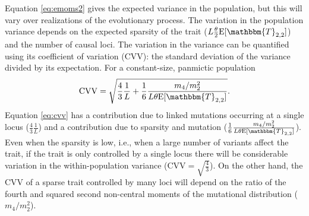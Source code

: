 Equation \eqref{eq:emoms2} gives the expected variance in the population, but
this will vary over realizations of the evolutionary process. The variation in
the population variance depends on the expected sparsity of the trait ($L\T
\E[\mathbbm{T}_{2,2}]$) and the number of causal loci. The variation in the
variance can be quantified using its coefficient of variation (CVV): the
standard deviation of the variance divided by its expectation. For a
constant-size, panmictic population
\begin{equation}
  \label{eq:cvv}
  \mathrm{CVV} = \sqrt{\frac{4}{3}\frac{1}{L} +
    \frac{1}{6}\frac{m_4/m_2^2}{L\theta \E[\mathbbm{T}_{2,2}]}}.
\end{equation}
Equation \eqref{eq:cvv} has a contribution due to linked mutations occurring at
a single locus ($\frac{4}{3}\frac{1}{L}$) and a contribution due to sparsity and
mutation ($\frac{1}{6}\frac{m_4/m_2^2}{L\theta \E[\mathbbm{T}_{2,2}]}$). Even
when the sparsity is low, i.e., when a large number of variants affect the
trait, if the trait is only controlled by a single locus there will be
considerable variation in the within-population variance
(CVV$=\sqrt{\frac{4}{3}}$). On the other hand, the CVV of a sparse trait
controlled by many loci will depend on the ratio of the fourth and squared
second non-central moments of the mutational distribution ($m_4/m_2^2$).

